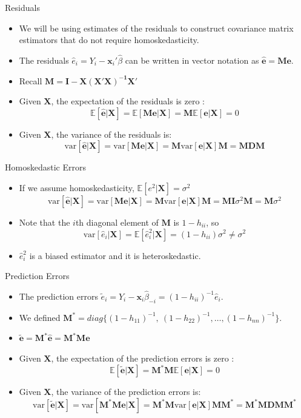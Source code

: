 \documentclass[aspectratio=169, handout]{beamer}
\numberwithin{equation}{section}
\newcommand{\var}{\text{var}}
\begin{document}
\begin{frame}{Residuals}
\begin{itemize}
\item We will be using estimates of the residuals to construct covariance matrix estimators that do not require homoskedasticity.
\item The residuals $\hat{e}_i=Y_i-\bm{x}_i'\hat{\beta}$ can be written in vector notation as $\bm{\hat{e}}=\bm{Me}$.  
\item Recall $\bm{M}=\bm{I}-\bm{X(X'X)^{-1}X'}$
\item Given $\bm{X}$, the expectation of the residuals is zero :
$$\mathbb{E}[\bm{\hat{e}}|\bm{X}]=\mathbb{E}[\bm{Me}|\bm{X}]=\bm{M}\mathbb{E}[\bm{e}|\bm{X}]=0$$
\item Given $\bm{X}$, the variance of the residuals is:
$$\var[\bm{\hat{e}}|\bm{X}]=\var[\bm{Me}|\bm{X}]=\bm{M}\var[\bm{e}|\bm{X}]\bm{M}=\bm{MDM}$$

\end{itemize}
\end{frame}
 
 
\begin{frame}{Homoskedastic Errors}
\begin{itemize}
 \item If we assume homoskedasticity, $\mathbb{E}[e^2|\bm{X}]=\sigma^2$
$$\var[\bm{\hat{e}}|\bm{X}]=\var[\bm{Me}|\bm{X}]=\bm{M}\var[\bm{e}|\bm{X}]\bm{M}=\bm{M}\bm{I}\sigma^2 \bm{M}=\bm{M}\sigma^2$$
\item Note that the $i$th diagonal element of $\bm{M}$ is $1-h_{ii}$, so
$$\var[\hat{e}_i|\bm{X}]=\mathbb{E}[\hat{e}^2_i|\bm{X}]=(1-h_{ii})\sigma^2\neq \sigma^2$$
\item $\hat{e}^2_i$ is a biased estimator and it is heteroskedastic.
\end{itemize}
\end{frame}
  
\begin{frame}{Prediction Errors}
\begin{itemize}
\item The prediction errors $\tilde{e}_i=Y_i-\bm{x}_i\hat{\beta}_{-i}=(1-h_{ii})^{-1}\hat{e}_i$.
\item We defined $\bm{M^*}=diag\{(1-h_{11})^{-1},\ (1-h_{22})^{-1},\ldots, (1-h_{nn})^{-1}\}$.
\item $\bm{\tilde{e}}=\bm{M}^*\bm{\hat{e}}=\bm{M}^*\bm{Me}$
\item Given $\bm{X}$, the expectation of the prediction errors is zero :
$$\mathbb{E}[\bm{\tilde{e}}|\bm{X}]=\bm{M^*M}\mathbb{E}[\bm{e}|\bm{X}]=0$$
\item Given $\bm{X}$, the variance of the prediction errors is:
 $$\var[\bm{\tilde{e}}|\bm{X}]=\var[\bm{M^*Me}|\bm{X}]=\bm{M^*M}\var[\bm{e}|\bm{X}]\bm{MM^*}=\bm{M^*MDMM^*}$$
\end{itemize}
\end{frame}
 
\end{document}
